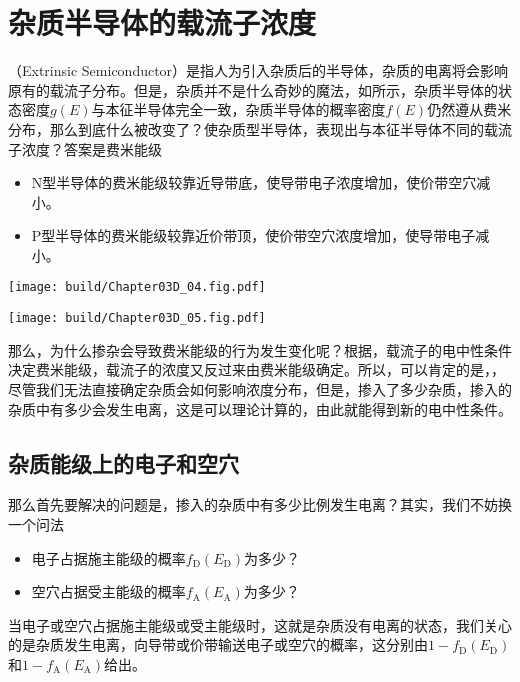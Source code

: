 \section{杂质半导体的载流子浓度}
（Extrinsic Semiconductor）是指人为引入杂质后的半导体，杂质的电离将会影响原有的载流子分布。但是，杂质并不是什么奇妙的魔法，如所示，杂质半导体的状态密度$g(E)$与本征半导体完全一致，杂质半导体的概率密度$f(E)$仍然遵从费米分布，那么到底什么被改变了？使杂质型半导体，表现出与本征半导体不同的载流子浓度？答案是费米能级
\begin{itemize}
    \item N型半导体的费米能级较靠近导带底，使导带电子浓度增加，使价带空穴减小。
    \item P型半导体的费米能级较靠近价带顶，使价带空穴浓度增加，使导带电子减小。
\end{itemize}
\begin{Figure}[杂质半导体的能带图]
    \begin{FigureSub}[N型半导体]
        \texttt{[image: build/Chapter03D\_04.fig.pdf]}
    \end{FigureSub}\vspace{0.5cm}
    \begin{FigureSub}[P型半导体]
        \texttt{[image: build/Chapter03D\_05.fig.pdf]}
    \end{FigureSub}
\end{Figure}
那么，为什么掺杂会导致费米能级的行为发生变化呢？根据，载流子的电中性条件决定费米能级，载流子的浓度又反过来由费米能级确定。所以，可以肯定的是，，尽管我们无法直接确定杂质会如何影响浓度分布，但是，掺入了多少杂质，掺入的杂质中有多少会发生电离，这是可以理论计算的，由此就能得到新的电中性条件。

\subsection{杂质能级上的电子和空穴}
那么首先要解决的问题是，掺入的杂质中有多少比例发生电离？其实，我们不妨换一个问法
\begin{itemize}
    \item 电子占据施主能级的概率$f_\text{D}(E_\text{D})$为多少？
    \item 空穴占据受主能级的概率$f_\text{A}(E_\text{A})$为多少？
\end{itemize}
当电子或空穴占据施主能级或受主能级时，这就是杂质没有电离的状态，我们关心的是杂质发生电离，向导带或价带输送电子或空穴的概率，这分别由$1-f_\text{D}(E_\text{D})$和$1-f_\text{A}(E_\text{A})$给出。

